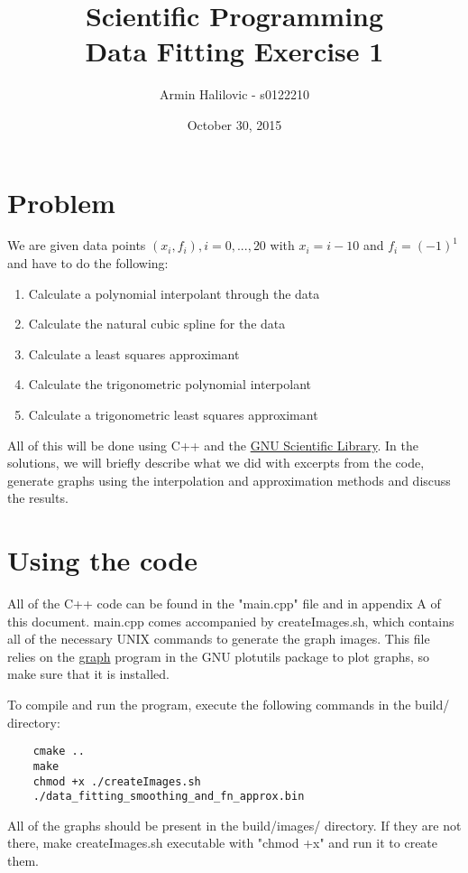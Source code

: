 \documentclass[11pt, a4paper, titlepage, openright]{article}
\title{\LARGE Scientific Programming \\ \normalsize Data Fitting Exercise 1}
\author{Armin Halilovic - s0122210}
\date{October 30, 2015}
\begin{document}

\onecolumn
\tableofcontents
\newpage



\section{Problem}
    We are given data points \( (x_i, f_i), i = 0, ..., 20 \) with \( x_i = i - 10 \) and \( f_i = (-1)^1 \) and have to do the following:
    \begin{enumerate}
        \item Calculate a polynomial interpolant through the data
        \item Calculate the natural cubic spline for the data
        \item Calculate a least squares approximant
        \item Calculate the trigonometric polynomial interpolant
        \item Calculate a trigonometric least squares approximant
    \end{enumerate}
    All of this will be done using C++ and the \href{http://www.gnu.org/software/gsl/}{GNU Scientific Library}.
    In the solutions, we will briefly describe what we did with excerpts from the code, generate graphs using the interpolation and approximation methods and discuss the results.

\section{Using the code}
    All of the C++ code can be found in the "main.cpp" file and in appendix A of this document.
    main.cpp comes accompanied by createImages.sh, which contains all of the necessary UNIX commands to generate the graph images.
    This file relies on the \href{https://www.gnu.org/software/plotutils/manual/en/html_node/graph.html}{graph} program
    in the GNU plotutils package to plot graphs, so make sure that it is installed.

    To compile and run the program, execute the following commands in the build/ directory:
    \begin{lstlisting}
    cmake ..
    make
    chmod +x ./createImages.sh
    ./data_fitting_smoothing_and_fn_approx.bin
    \end{lstlisting}
    All of the graphs should be present in the build/images/ directory. If they are not there, make createImages.sh
    executable with "chmod +x" and run it to create them.
\end{document}
